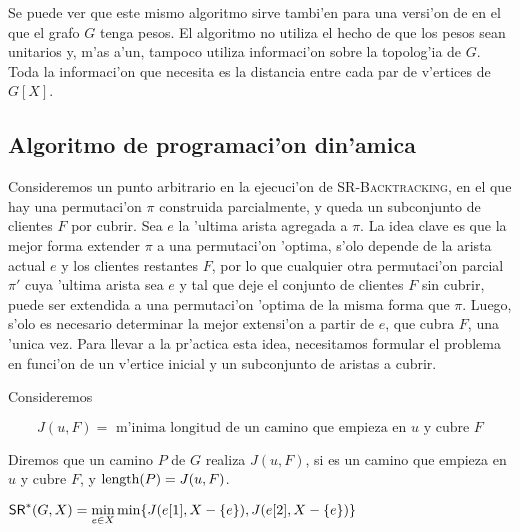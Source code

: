 Se puede ver que este mismo algoritmo sirve tambi'en para una versi'on de  en el que el grafo $G$ tenga pesos. El algoritmo no utiliza el hecho de que los pesos sean unitarios y, m'as a'un, tampoco utiliza informaci'on sobre la topolog'ia de $G$. Toda la informaci'on que necesita es la distancia entre cada par de v'ertices de $G[X]$.

\subsection{Algoritmo de programaci'on din'amica}

Consideremos un punto arbitrario en la ejecuci'on de \textsc{SR-Backtracking}, en el que hay una permutaci'on $\pi$ construida parcialmente, y queda un subconjunto de clientes $F$ por cubrir. Sea $e$ la 'ultima arista agregada a $\pi$. La idea clave es que la mejor forma extender $\pi$ a una permutaci'on 'optima, s'olo depende de la arista actual $e$ y los clientes restantes $F$, por lo que cualquier otra permutaci'on parcial $\pi'$ cuya 'ultima arista sea $e$ y tal que deje el conjunto de clientes $F$ sin cubrir, puede ser extendida a una permutaci'on 'optima de la misma forma que $\pi$. Luego, s'olo es necesario determinar la mejor extensi'on a partir de $e$, que cubra $F$, una 'unica vez. Para llevar a la pr'actica esta idea, necesitamos formular el problema en funci'on de un v'ertice inicial y un subconjunto de aristas a cubrir.

Consideremos

\[J(u, F) = \text{ m'inima longitud de un camino que empieza en } u \text{ y cubre }F\]

Diremos que un camino $P$ de $G$ realiza $J(u, F)$, si es un camino que empieza en $u$ y cubre $F$, y $\textnormal{length}(P) = J(u, F)$.

\begin{remark}
\label{re:sr_minima_longitud}
$\textnormal{\textsf{SR}}^*(G, X) = \min\limits_{e \in X} \min \{J(e[1], X - \{e\}), J(e[2], X - \{e\})\}$
\end{remark}

